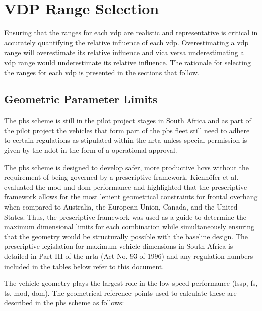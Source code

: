 \chapter{VDP Range Selection}\label{chapter:parameter-range-selection}

Ensuring that the ranges for each \gls{vdp} are realistic and representative is critical in accurately quantifying the relative influence of each \gls{vdp}. Overestimating a \gls{vdp} range will overestimate its relative influence and vica versa underestimating a \gls{vdp} range would underestimate its relative influence. The rationale for selecting the ranges for each \gls{vdp} is presented in the sections that follow.

\section{Geometric Parameter Limits}\label{section:geometric-limits}

The \gls{pbs} scheme is still in the pilot project stages in South Africa and as part of the pilot project the vehicles that form part of the \gls{pbs} fleet still need to adhere to certain regulations as stipulated within the \gls{nrta} unless special permission is given by the \gls{ndot} in the form of a operational approval.

The \gls{pbs} scheme is designed to develop safer, more productive \glspl{hcv} without the requirement of being governed by a prescriptive framework. Kienh{\"o}fer et al. \cite{Kienhofer2014} evaluated the \gls{mod} and \gls{dom} performance and highlighted that the prescriptive framework allows for the most lenient geometrical constraints for frontal overhang when compared to Australia, the European Union, Canada, and the United States. Thus, the prescriptive framework was used as a guide to determine the maximum dimensional limits for each combination while simultaneously ensuring that the geometry would be structurally possible with the baseline design. The prescriptive legislation for maximum vehicle dimensions in South Africa is detailed in Part III of the \gls{nrta} (Act No. 93 of 1996) \cite{NationalDepartmentofTransport2003} and any regulation numbers included in the tables below refer to this document.

The vehicle geometry plays the largest role in the low-speed performance (\gls{lssp}, \gls{fs}, \gls{ts}, \gls{mod}, \gls{dom}). The geometrical reference points used to calculate these are described in the \gls{pbs} scheme \cite{NationalTransportCommission2008} as follows:

